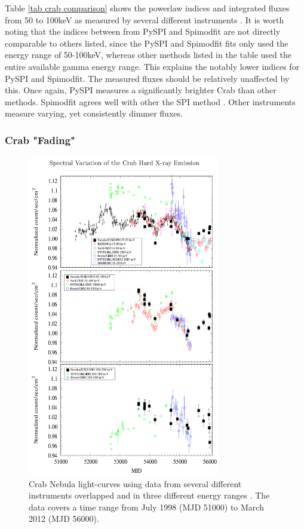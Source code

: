 \documentclass{report}
\begin{document}
Table \ref{tab crab comparison} shows the powerlaw indices and integrated fluxes from 50 to 100keV as measured by several different instruments \cite{sizun2004integralspi}. It is worth noting that the indices between from PySPI and Spimodfit are not directly comparable to others listed, since the PySPI and Spimodfit fits only used the energy range of 50-100keV, whereas other methods listed in the table used the entire available gamma energy range. This explains the notably lower indices for PySPI and Spimodfit. The measured fluxes should be relatively unaffected by this. Once again, PySPI measures a significantly brighter Crab than other methods. Spimodfit agrees well with other the SPI method \cite{sizun2004integralspi}. Other instruments measure varying, yet consistently dimmer fluxes.

\subsubsection*{Crab "Fading"}

\begin{figure}[h]
  \centering
  \includegraphics[width=0.75\textwidth]{Images/Crab_Fits/Crab_light_curve.PNG}
  \caption{Crab Nebula light-curves using data from several different instruments overlapped and in three different energy ranges \cite{sizun2004integralspi}. The data covers a time range from July 1998 (MJD 51000) to March 2012 (MJD 56000).}
  \label{fig crab light curve}
\end{figure}
\end{document}

